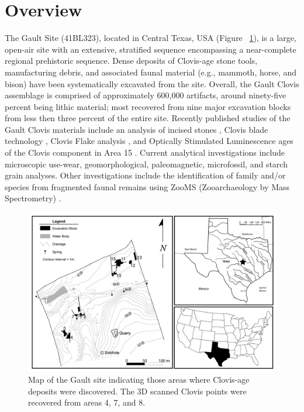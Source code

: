 \documentclass[preprint,12pt]{elsarticle}
\begin{document}
\linenumbers

\section{Overview} %
The Gault Site (41BL323), located in Central Texas, USA (Figure ~\ref{fig:Fig1}), is a large, open-air site with an extensive, stratified sequence encompassing a near-complete regional prehistoric sequence. Dense deposits of Clovis-age stone tools,  manufacturing debris, and associated faunal material (e.g., mammoth, horse, and bison) have been systematically excavated from the site\cite{Collins2002}. Overall, the Gault Clovis assemblage is comprised of approximately 600,000 artifacts, around ninety-five percent being lithic material; most recovered from nine major excavation blocks from less then three percent of the entire site. Recently published studies of the Gault Clovis materials include an analysis of incised stones \cite{Lemke2015}, Clovis blade technology \cite{Williams2016}, Clovis Flake analysis \cite{Velchoff2015}, and Optically Stimulated Luminescence ages of the Clovis component in Area 15 \cite{Rodrigues2016}. Current analytical investigations include microscopic use-wear, geomorphological, paleomagnetic, microfossil, and starch grain analyses. Other investigations include the identification of family and/or species from fragmented faunal remains using ZooMS (Zooarchaeology by Mass Spectrometry) \cite{KeenanEarly2016,Buckley2008}. 

\begin{figure}[ht]\centering
\includegraphics[width=\linewidth]{Fig_1}
\caption{Map of the Gault site indicating those areas where Clovis-age deposits were discovered. The 3D scanned Clovis points were recovered from areas 4, 7, and 8.}
\label{fig:Fig1}
\end{figure}
\end{document}
